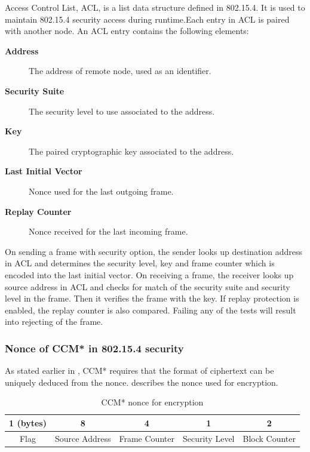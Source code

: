 Access Control List, ACL, is a list data structure defined in 802.15.4. It is used to maintain 802.15.4 security access during runtime.Each entry in ACL is paired with another node.  An ACL entry contains the following elements:
\begin{description}
	\item[\textbf{Address}] The address of remote node, used as an identifier.
	\item[\textbf{Security Suite}] The security level to use associated to the address.
	\item[\textbf{Key}] The paired cryptographic key associated to the address.
	\item[\textbf{Last Initial Vector}] Nonce used for the last outgoing frame.
	\item[\textbf{Replay Counter}] Nonce received for the last incoming frame.
\end{description}
On sending a frame with security option, the sender looks up destination address in ACL and determines the security level, key and frame counter which is encoded into the last initial vector. On receiving a frame, the receiver looks up source address in ACL and checks for match of the security suite and security level in the frame. Then it verifies the frame with the key. If replay protection is enabled, the replay counter is also compared. Failing any of the tests will result into rejecting of the frame.

\subsubsection{Nonce of CCM* in 802.15.4 security}
As stated earlier in , CCM* requires that the format of ciphertext can be uniquely deduced from the nonce.  describes the nonce used for encryption.

\begin{table}[h!]
	\centering
	\begin{tabular}{|c|c|c|c|c|}
		\hline
		1 (bytes) & 8              & 4             & 1              & 2             \\ \hline
		Flag      & Source Address & Frame Counter & Security Level & Block Counter \\ \hline
	\end{tabular}
	\caption{CCM* nonce for encryption}
	\label{Tbl: CCM nonce}
\end{table}

